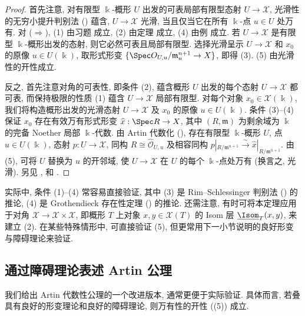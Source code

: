 \begin{proof}
首先注意, 对有限型 $\Bbbk$-概形 $U$ 出发的可表局部有限型态射 $U\to\mathcal X$, 光滑性的无穷小提升判别法 () 蕴含, $U\to\mathcal X$ 光滑, 当且仅当它在所有 $\Bbbk$-点 $u\in U$ 处万有. 对 ($\Rightarrow$), (1) 由习题  成立, (2) 由定理  成立, (4) 由例  成立. 若 $U\to\mathcal X$ 是有限型 $\Bbbk$-概形出发的态射, 则它必然可表且局部有限型. 选择光滑呈示 $U\to\mathcal X$ 和 $x_0$ 的原像 $u\in U(\Bbbk)$, 取形式形变 $\{\Spec\mathcal O_{U,u}/\mathfrak m_u^{n+1}\to\mathcal X\}$, 即得 (3). (5) 由光滑性的开性成立.

反之, 首先注意对角的可表性, 即条件 (2), 蕴含概形 $U$ 出发的每个态射 $U\to\mathcal X$ 都可表, 而保持极限的性质 (1) 蕴含 $U\to\mathcal X$ 局部有限型. 对每个对象 $x_0\in\mathcal X(\Bbbk)$, 我们将构造概形出发的光滑态射 $U\to\mathcal X$ 及 $x_0$ 的原像 $u\in U(\Bbbk)$. 条件 (3)--(4) 保证 $x_0$ 存在有效万有形式形变 $\widehat x:\Spec R\to\mathcal X$, 其中 $(R,\mathfrak m)$ 为剩余域为 $\Bbbk$ 的完备 Noether 局部 $\Bbbk$-代数. 由 Artin 代数化 (), 存在有限型 $\Bbbk$-概形 $U$, 点 $u\in U(\Bbbk)$, 态射 $p:U\to\mathcal X$, 同构 $R\cong\widehat{\mathcal O}_{U,u}$ 及相容同构 $p|_{R/\mathfrak m^{n+1}}\xrightarrow\sim\widehat x|_{R/\mathfrak m^{n+1}}$. 由 (5), 可将 $U$ 替换为 $u$ 的开邻域, 使 $U\to\mathcal X$ 在 $U$ 的每个 $\Bbbk$-点处万有 (换言之, 光滑). 另见 \cite[\S$5$]{Art74b}, \cite[推论 $10.11$]{LMB00} 和 \cite[Tag 07Y4]{SP}.
\end{proof}
\begin{remark}\label{src:C.7.2}
实际中, 条件 (1)--(4) 常容易直接验证, 其中 (3) 是 Rim--Schlessinger 判别法 () 的推论, (4) 是 Grothendieck 存在性定理 () 的推论. 还需注意, 有时可将本定理应用于对角 $\mathcal X\to\mathcal X\times\mathcal X$, 即概形 $T$ 上对象 $x,y\in\mathcal X(T)$ 的 Isom 层 $\underline{\Isom}_T(x,y)$, 来建立 (2). 在某些特殊情形中, 可直接验证 (5), 但更常用下一小节说明的良好形变与障碍理论来验证.
\end{remark}
\subsection{通过障碍理论表述 Artin 公理}\label{src:C.7.1-subsection}
我们给出 Artin 代数性公理的一个改进版本, 通常更便于实际验证. 具体而言, 若叠具有良好的形变理论和良好的障碍理论, 则万有性的开性 ((5)) 成立.

